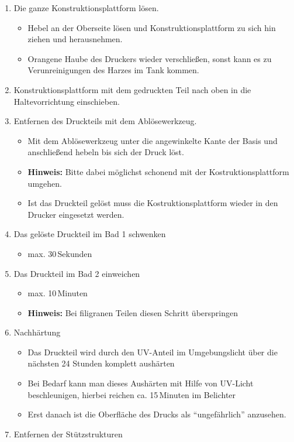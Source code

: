 \documentclass{\basedir/fablab-document}
\begin{document}
	\begin{enumerate}
	\item Die ganze Konstruktionsplattform lösen.
	\begin{itemize}
		\item Hebel an der Oberseite lösen und Konstruktionsplattform zu sich hin ziehen und herausnehmen.
		\item Orangene Haube des Druckers wieder verschließen, sonst kann es zu Verunreinigungen des Harzes im Tank kommen.
	\end{itemize}
	\item Konstruktionsplattform mit dem gedruckten Teil nach oben in die Haltevorrichtung einschieben.
	\item Entfernen des Druckteils mit dem Ablösewerkzeug.
	\begin{itemize}
		\item Mit dem Ablösewerkzeug unter die angewinkelte Kante der Basis und anschließend hebeln bis sich der Druck löst.
		\item \textbf{Hinweis:} Bitte dabei möglichst schonend mit der Kostruktionsplattform umgehen.
		\item Ist das Druckteil gelöst muss die Kostruktionsplattform wieder in den Drucker eingesetzt werden.
	\end{itemize}
	\item Das gelöste Druckteil im Bad 1 schwenken
	\begin{itemize}
		\item max. 30\,Sekunden
	\end{itemize}
	\item Das Druckteil im Bad 2 einweichen
	\begin{itemize}
		\item max. 10\,Minuten
		\item \textbf{Hinweis:} Bei filigranen Teilen diesen Schritt überspringen
	\end{itemize}
	\item Nachhärtung
		\begin{itemize}
		\item Das Druckteil wird durch den UV-Anteil im Umgebungslicht über die nächsten 24 Stunden komplett aushärten 
		\item Bei Bedarf kann man dieses Aushärten mit Hilfe von UV-Licht beschleunigen, hierbei reichen ca. 15\,Minuten im Belichter
		\item Erst danach ist die Oberfläche des Drucks als \enquote{ungefährlich} anzusehen.
	\end{itemize}
	\item Entfernen der Stützstrukturen
	
	\end{enumerate}
	
\end{document}
